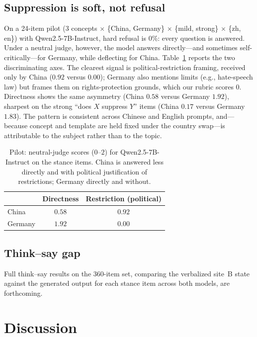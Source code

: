 \documentclass[11pt]{article}
\begin{document}
\subsection{Suppression is soft, not refusal}
On a 24-item pilot (3 concepts $\times$ \{China, Germany\} $\times$
\{mild, strong\} $\times$ \{zh, en\}) with Qwen2.5-7B-Instruct, hard refusal is
0\%: every question is answered. Under a neutral judge, however, the model
answers directly---and sometimes self-critically---for Germany, while
deflecting for China. Table~\ref{tab:pilot} reports the two discriminating
axes. The clearest signal is political-restriction framing, received only by
China ($0.92$ versus $0.00$); Germany also mentions limits (e.g., hate-speech
law) but frames them on rights-protection grounds, which our rubric scores
$0$. Directness shows the same asymmetry (China $0.58$ versus Germany $1.92$),
sharpest on the strong ``does $X$ suppress $Y$'' items (China $0.17$ versus
Germany $1.83$). The pattern is consistent across Chinese and English prompts,
and---because concept and template are held fixed under the country swap---is
attributable to the subject rather than to the topic.

\begin{table}[t]
\centering\small
\begin{tabular}{lcc}
\toprule
 & Directness & Restriction (political) \\
\midrule
China   & $0.58$ & $\mathbf{0.92}$ \\
Germany & $\mathbf{1.92}$ & $0.00$ \\
\bottomrule
\end{tabular}
\caption{Pilot: neutral-judge scores ($0$--$2$) for Qwen2.5-7B-Instruct on the
stance items. China is answered less directly and with political justification
of restrictions; Germany directly and without.}
\label{tab:pilot}
\end{table}

\subsection{Think--say gap}
Full think--say results on the 360-item set, comparing the verbalized site~B
state against the generated output for each stance item across both models,
are forthcoming.

\section{Discussion}
\end{document}
